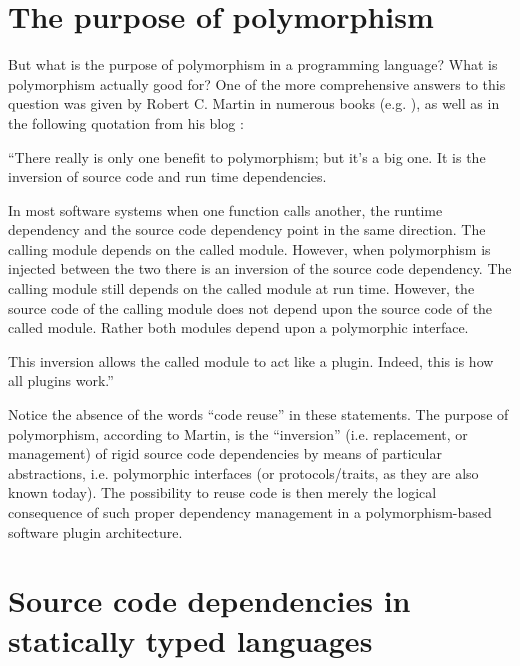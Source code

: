 \documentclass[11pt,oneside]{report}
\begin{document}
\section{The purpose of polymorphism}

But what is the purpose of polymorphism in a programming language?
What is polymorphism actually good for? One of the more comprehensive
answers to this question was given by Robert C. Martin in numerous
books (e.g. \cite{Martin_17}), as well as in the following quotation
from his blog \cite{Martin_14}:

\begin{displayquote}
``There really is only one benefit to polymorphism; but it's a big
  one. It is the inversion of source code and run time dependencies.

  In most software systems when one function calls another, the
  runtime dependency and the source code dependency point in the same
  direction. The calling module depends on the called module. However,
  when polymorphism is injected between the two there is an inversion
  of the source code dependency. The calling module still depends on
  the called module at run time. However, the source code of the
  calling module does not depend upon the source code of the called
  module. Rather both modules depend upon a polymorphic
  interface.

  This inversion allows the called module to act like a
  plugin. Indeed, this is how all plugins work.''
\end{displayquote}

Notice the absence of the words ``code reuse'' in these statements.
The purpose of polymorphism, according to Martin, is the ``inversion''
(i.e. replacement, or management) of rigid source code dependencies by
means of particular abstractions, i.e. polymorphic interfaces (or
proto\-cols/traits, as they are also known today). The possibility to
reuse code is then merely the logical consequence of such proper
dependency management in a polymorphism-based software plugin
architecture.

\section{Source code dependencies in statically typed languages}
\end{document}
